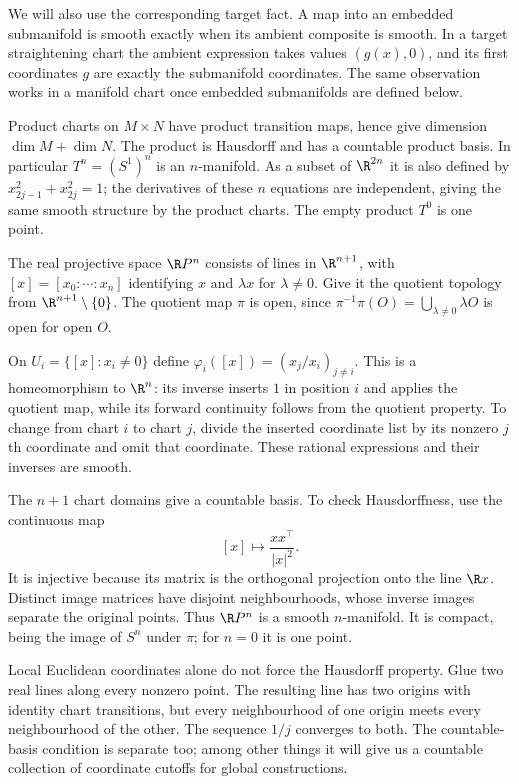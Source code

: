 We will also use the corresponding target fact. A map into an embedded submanifold is smooth exactly when its ambient composite is smooth. In a target straightening chart the ambient expression takes values $(g(x),0)$, and its first coordinates $g$ are exactly the submanifold coordinates. The same observation works in a manifold chart once embedded submanifolds are defined below.

\begin{example}
Product charts on $M\times N$ have product transition maps, hence give dimension $\dim M+\dim N$. The product is Hausdorff and has a countable product basis. In particular $T^n=(S^1)^n$ is an $n$-manifold. As a subset of $\R^{2n}$ it is also defined by $x_{2j-1}^2+x_{2j}^2=1$; the derivatives of these $n$ equations are independent, giving the same smooth structure by the product charts. The empty product $T^0$ is one point.
\end{example}

\begin{example}\label{ex:rpn}
The real projective space $\R P^n$ consists of lines in $\R^{n+1}$, with $[x]=[x_0:\cdots:x_n]$ identifying $x$ and $\lambda x$ for $\lambda\ne0$. Give it the quotient topology from $\R^{n+1}\setminus\{0\}$. The quotient map $\pi$ is open, since $\pi^{-1}\pi(O)=\bigcup_{\lambda\ne0}\lambda O$ is open for open $O$.

On $U_i=\{[x]:x_i\ne0\}$ define $\varphi_i([x])=(x_j/x_i)_{j\ne i}$. This is a homeomorphism to $\R^n$: its inverse inserts $1$ in position $i$ and applies the quotient map, while its forward continuity follows from the quotient property. To change from chart $i$ to chart $j$, divide the inserted coordinate list by its nonzero $j$th coordinate and omit that coordinate. These rational expressions and their inverses are smooth.

The $n+1$ chart domains give a countable basis. To check Hausdorffness, use the continuous map
\[
[x]\longmapsto\frac{xx^\top}{|x|^2}.
\]
It is injective because its matrix is the orthogonal projection onto the line $\R x$. Distinct image matrices have disjoint neighbourhoods, whose inverse images separate the original points. Thus $\R P^n$ is a smooth $n$-manifold. It is compact, being the image of $S^n$ under $\pi$; for $n=0$ it is one point.
\end{example}

\begin{remark}
Local Euclidean coordinates alone do not force the Hausdorff property. Glue two real lines along every nonzero point. The resulting line has two origins with identity chart transitions, but every neighbourhood of one origin meets every neighbourhood of the other. The sequence $1/j$ converges to both. The countable-basis condition is separate too; among other things it will give us a countable collection of coordinate cutoffs for global constructions.
\end{remark}

